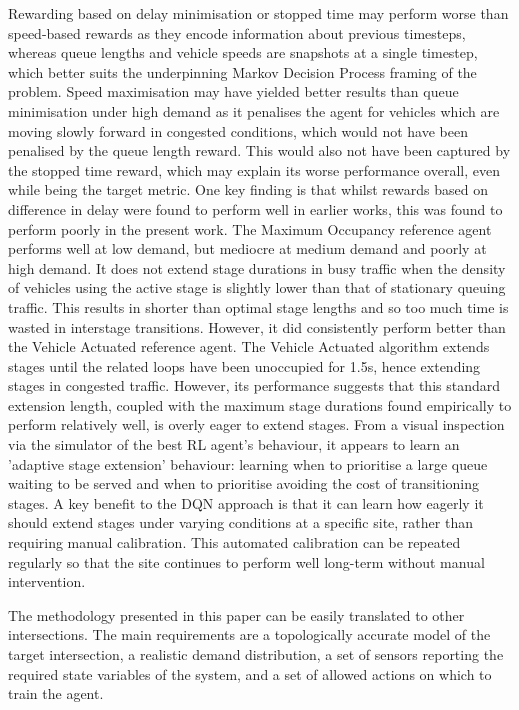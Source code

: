 \documentclass{article}
\begin{document}
Rewarding based on delay minimisation or stopped time may perform worse than speed-based rewards as they encode information about previous timesteps, whereas queue lengths and vehicle speeds are snapshots at a single timestep, which better suits the underpinning Markov Decision Process framing of the problem.
Speed maximisation may have yielded better results than queue minimisation under high demand as it penalises the agent for vehicles which are moving slowly forward in congested conditions, which would not have been penalised by the queue length reward.
This would also not have been captured by the stopped time reward, which may explain its worse performance overall, even while being the target metric. One key finding is that whilst rewards based on difference in delay were found to perform well in earlier works, this was found to perform poorly in the present work.
The Maximum Occupancy reference agent performs well at low demand, but mediocre at medium demand and poorly at high demand.
It does not extend stage durations in busy traffic when the density of vehicles using the active stage is slightly lower than that of stationary queuing traffic.
This results in shorter than optimal stage lengths and so too much time is wasted in interstage transitions.
However, it did consistently perform better than the Vehicle Actuated reference agent.
The Vehicle Actuated algorithm extends stages until the related loops have been unoccupied for 1.5s, hence extending stages in congested traffic.
However, its performance suggests that this standard extension length, coupled with the maximum stage durations found empirically to perform relatively well, is overly eager to extend stages.
From a visual inspection via the simulator of the best RL agent's behaviour, it appears to learn an 'adaptive stage extension' behaviour: learning when to prioritise a large queue waiting to be served and when to prioritise avoiding the cost of transitioning stages.
A key benefit to the DQN approach is that it can learn how eagerly it should extend stages under varying conditions at a specific site, rather than requiring manual calibration.
This automated calibration can be repeated regularly so that the site continues to perform well long-term without manual intervention.

The methodology presented in this paper can be easily translated to other intersections.
The main requirements are a topologically accurate model of the target intersection, a realistic demand distribution, a set of sensors reporting the required state variables of the system, and a set of allowed actions on which to train the agent.
\end{document}
